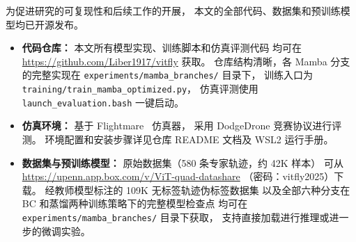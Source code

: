 \documentclass[12pt,a4paper]{article}
\numberwithin{equation}{section}
\numberwithin{figure}{section}
\numberwithin{table}{section}
\begin{document}
为促进研究的可复现性和后续工作的开展，
本文的全部代码、数据集和预训练模型均已开源发布。

\begin{itemize}
    \item \textbf{代码仓库：}
          本文所有模型实现、训练脚本和仿真评测代码
          均可在 \url{https://github.com/Liber1917/vitfly} 获取。
          仓库结构清晰，各 Mamba 分支的完整实现在
          \texttt{experiments/mamba\_branches/} 目录下，
          训练入口为 \texttt{training/train\_mamba\_optimized.py}，
          仿真评测使用 \texttt{launch\_evaluation.bash} 一键启动。
    \item \textbf{仿真环境：}
          基于 Flightmare~\cite{shah2017flightmare} 仿真器，
          采用 DodgeDrone 竞赛协议进行评测。
          环境配置和安装步骤详见仓库 README 文档及 WSL2 运行手册。
    \item \textbf{数据集与预训练模型：}
          原始数据集（580 条专家轨迹，约 42K 样本）
          可从 \url{https://upenn.app.box.com/v/ViT-quad-datashare}
          （密码：vitfly2025）下载。
          经教师模型标注的 109K 无标签轨迹伪标签数据集
          以及全部六种分支在 BC 和蒸馏两种训练策略下的完整模型检查点
          均可在 \texttt{experiments/mamba\_branches/} 目录下获取，
          支持直接加载进行推理或进一步的微调实验。
\end{itemize}
\end{document}
